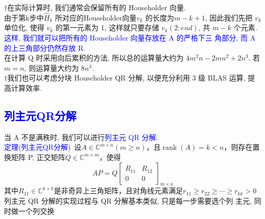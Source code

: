 \documentclass[12pt,a4paper]{article}
\begin{document}
$\dagger$在实际计算时, 我们通常会保留所有的 Householder 向量.\\

由于第k步中$\hat{H}_{k}$ 所对应的Householder向量$v_{k}$ 的长度为$m−k+1$, 因此我们先把 $v_{k}$ 单位化, 使得 $v_{k}$ 的第一元素为 1, 这样就只要存储 $v_{k}(2:end)$, 共 $m - k$ 个元素.\\

\textcolor{blue}{这样, 我们就可以把所有的 Householder 向量存放在 A 的严格下三 角部分, 而 A 的上三角部分仍然存放 R.}\\

在计算 Q 时采用向后累积的方法, 所以总的运算量大约为 $4m^{2}n - 2mn^{2} + 2n^{3}$. 若 $m = n$, 则运算量大约为 $8n^{3}$.\\

$\dagger$我们也可以考虑分块 Householder QR 分解, 以便充分利用 3 级 BLAS 运算, 提高计算效率.\\
\subsection{\textcolor{blue}{列主元QR分解}}
\noindent 当 A 不是满秩时, 我们可以进行\textcolor{blue}{列主元 QR 分解.}\\
\textcolor{blue}{定理(列主元QR分解)}~设$A \in \mathbb{C}^{m \times n}(m \geq n)$，且$\operatorname{rank}(A)=k<n$，则存在置换矩阵 P, 正交矩阵$Q \in \mathbb{C}^{m \times m}$，使得
$$
A P=Q\left[\begin{array}{cc}{R_{11}} & {R_{12}} \\ {0} & {0}\end{array}\right]_{m \times n}
$$
其中$R_{11} \in \mathbb{C}^{k \times k}$是非奇异上三角矩阵，且对角线元素满足$r_{11} \geq r_{22} \geq \cdots \geq r_{k k}>0$\\

列主元 QR 分解的实现过程与 QR 分解基本类似, 只是每一步需要选个列 主元, 同时做一个列交换\\
\end{document}
